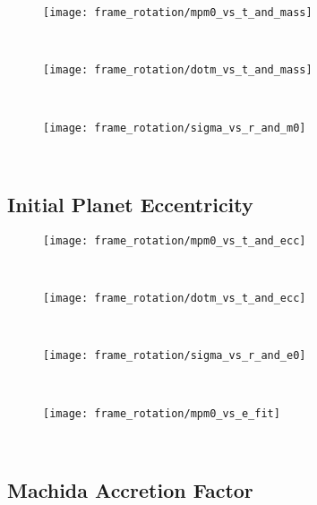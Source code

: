       \begin{figure}[h!]
        \centering
        \texttt{[image: frame\_rotation/mpm0\_vs\_t\_and\_mass]}
        \caption{}
        \label{}
      \end{figure} \ \\ 
      
      \begin{figure}[h!]
        \centering
        \texttt{[image: frame\_rotation/dotm\_vs\_t\_and\_mass]}
        \caption{}
        \label{}
      \end{figure} \ \\ 
      
      \begin{figure}[h!]
        \centering
        \texttt{[image: frame\_rotation/sigma\_vs\_r\_and\_m0]}
        \caption{}
        \label{}
      \end{figure} \ \\ 

    \subsection{Initial Planet Eccentricity}
  
      \begin{figure}[h!]
        \centering
        \texttt{[image: frame\_rotation/mpm0\_vs\_t\_and\_ecc]}
        \caption{}
        \label{}
      \end{figure} \ \\
      
      \begin{figure}[h!]
        \centering
        \texttt{[image: frame\_rotation/dotm\_vs\_t\_and\_ecc]}
        \caption{}
        \label{}
      \end{figure} \ \\ 
      
      \begin{figure}[h!]
        \centering
        \texttt{[image: frame\_rotation/sigma\_vs\_r\_and\_e0]}
        \caption{}
        \label{}
      \end{figure} \ \\ 
  
      \begin{figure}[h!]
        \centering
        \texttt{[image: frame\_rotation/mpm0\_vs\_e\_fit]}
        \caption{}
        \label{}
      \end{figure} \ \\ 

    \subsection{Machida Accretion Factor}

